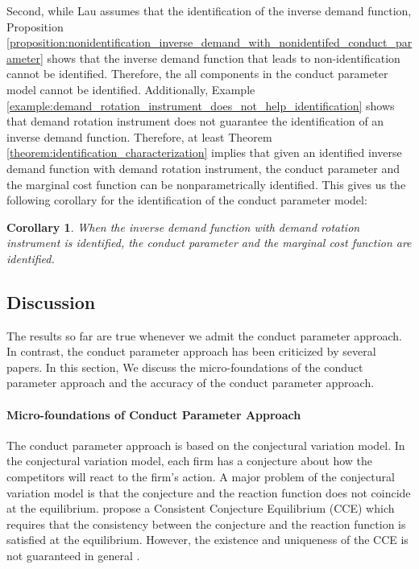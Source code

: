 \documentclass[11pt, a4paper]{article}
\newtheorem{corollary}{Corollary}
\theoremstyle{remark}
\begin{document}
Second, while Lau assumes that the identification of the inverse demand function, Proposition \ref{proposition:nonidentification_inverse_demand_with_nonidentifed_conduct_parameter} shows that the inverse demand function that leads to non-identification cannot be identified.
Therefore, the all components in the conduct parameter model cannot be identified.
Additionally, Example \ref{example:demand_rotation_instrument_does_not_help_identification} shows that demand rotation instrument does not guarantee the identification of an inverse demand function.
Therefore, at least Theorem \ref{theorem:identification_characterization} implies that given an identified inverse demand function with demand rotation instrument, the conduct parameter and the marginal cost function can be nonparametrically identified.
This gives us the following corollary for the identification of the conduct parameter model:
\begin{corollary}\label{corollary:identification_conduct_parameter_model}
    When the inverse demand function with demand rotation instrument is identified, the conduct parameter and the marginal cost function are identified.
\end{corollary}




\subsection{Discussion}\label{subsec:main_result_discussion}
The results so far are true whenever we admit the conduct parameter approach.
In contrast, the conduct parameter approach has been criticized by several papers.
In this section, We discuss the micro-foundations of the conduct parameter approach and the accuracy of the conduct parameter approach.

\paragraph{Micro-foundations of Conduct Parameter Approach}
The conduct parameter approach is based on the conjectural variation model.
In the conjectural variation model, each firm has a conjecture about how the competitors will react to the firm's action.
A major problem of the conjectural variation model is that the conjecture and the reaction function does not coincide at the equilibrium.
\citet{bresnahanDuopoly1981,bresnahanExistence1983}  propose a Consistent Conjecture Equilibrium (CCE) which requires that the consistency between the conjecture and the reaction function is satisfied at the equilibrium.
However, the existence and uniqueness of the CCE is not guaranteed in general \citep{klempererConsistent1988,robsonExistence1983}.
\end{document}
